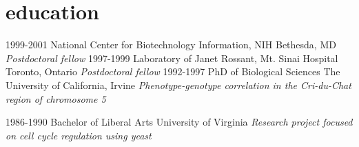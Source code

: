 \documentclass[]{dmc-cv} %
\begin{document}
\section{education}

\begin{entrylist}
\entry
{1999-2001}
{National Center for Biotechnology Information, NIH}
{Bethesda, MD}
{\emph{Postdoctoral fellow}
}
\entry
{1997-1999}
{Laboratory of Janet Rossant, Mt. Sinai Hospital}
{Toronto, Ontario}
{\emph{Postdoctoral fellow}
}
\entry
{1992-1997}
{PhD {\normalfont of Biological Sciences}}
{The University of California, Irvine}
{\emph{Phenotype-genotype correlation in the Cri-du-Chat region of chromosome 5}
}

\entry
{1986-1990}
{Bachelor {\normalfont of Liberal Arts}}
{University of Virginia}
{\emph{Research project focused on cell cycle regulation using yeast}
}
\end{entrylist}





\end{document}
